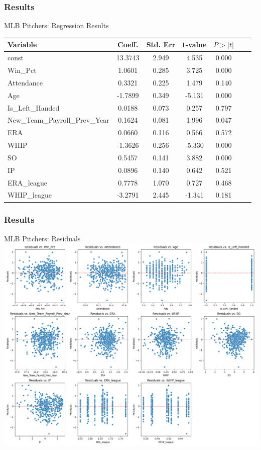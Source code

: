 \documentclass[9pt]{beamer}
\begin{document}
\begin{frame}
    \frametitle{Results}
    \begin{block}{MLB Pitchers: Regression Results}
        \begin{table}[ht]
            \centering
            \begin{tabular}{lcccccc}
            \toprule
            Variable & Coeff. & Std. Err & t-value & $P > |t|$ \\
            \midrule
            const & 13.3743 & 2.949 & 4.535 & 0.000 \\
            Win\_Pct & 1.0601 & 0.285 & 3.725 & 0.000  \\
            Attendance & 0.3321 & 0.225 & 1.479 & 0.140  \\
            Age & -1.7899 & 0.349 & -5.131 & 0.000  \\
            Is\_Left\_Handed & 0.0188 & 0.073 & 0.257 & 0.797  \\
            New\_Team\_Payroll\_Prev\_Year & 0.1624 & 0.081 & 1.996 & 0.047 \\
            ERA & 0.0660 & 0.116 & 0.566 & 0.572 \\
            WHIP & -1.3626 & 0.256 & -5.330 & 0.000  \\
            SO & 0.5457 & 0.141 & 3.882 & 0.000  \\
            IP & 0.0896 & 0.140 & 0.642 & 0.521  \\
            ERA\_league & 0.7778 & 1.070 & 0.727 & 0.468  \\
            WHIP\_league & -3.2791 & 2.445 & -1.341 & 0.181  \\
            \bottomrule
            \end{tabular}
            \end{table}
    \end{block}
\end{frame}
\begin{frame}
    \frametitle{Results}
    \begin{block}{MLB Pitchers: Residuals}
        \centering
        \includegraphics[height=0.75\textheight,keepaspectratio]{images/mlb_pitchers_residuals.png}
    \end{block}
\end{frame}
\end{document}
